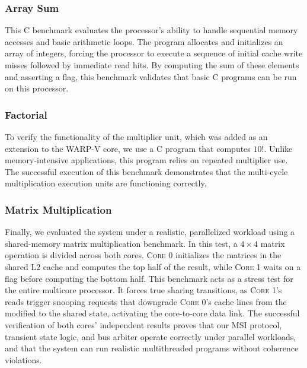 \documentclass[10pt, compsoc]{IEEEtran}
\begin{document}
\subsubsection*{Array Sum}

This C benchmark evaluates the processor's ability to handle sequential memory accesses and basic arithmetic loops. The program allocates and initializes an array of integers, forcing the processor to execute a sequence of initial cache write misses followed by immediate read hits. By computing the sum of these elements and asserting a flag, this benchmark validates that basic C programs can be run on this processor.





\subsubsection*{Factorial}

To verify the functionality of the multiplier unit, which was added as an extension to the WARP-V core, we use a C program that computes $10!$. Unlike memory-intensive applications, this program relies on repeated multiplier use. The successful execution of this benchmark demonstrates that the multi-cycle multiplication execution units are functioning correctly. 



\subsubsection*{Matrix Multiplication}

Finally, we evaluated the system under a realistic, parallelized workload using a shared-memory matrix multiplication benchmark. In this test, a $4\times 4$ matrix operation is divided across both cores. \textsc{Core 0} initializes the matrices in the shared L2 cache and computes the top half of the result, while \textsc{Core 1} waits on a flag before computing the bottom half. This benchmark acts as a stress test for the entire multicore processor. It forces true sharing transitions, as \textsc{Core 1}'s reads trigger snooping requests that downgrade \textsc{Core 0}'s cache lines from the modified to the shared state, activating the core-to-core data link. The successful verification of both cores' independent results proves that our MSI protocol, transient state logic, and bus arbiter operate correctly under parallel workloads, and that the system can run realistic multithreaded programs without coherence violations.
\end{document}
